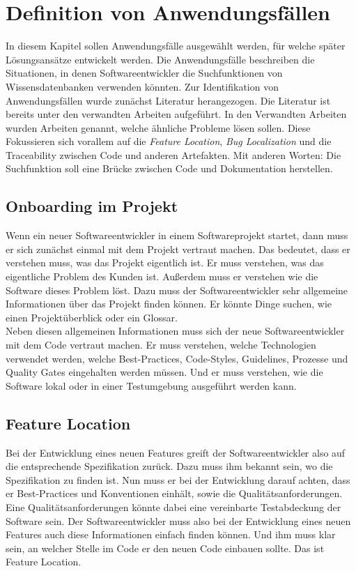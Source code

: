 \chapter{Definition von Anwendungsfällen}
In diesem Kapitel sollen Anwendungsfälle ausgewählt werden, für welche später Lösungsansätze entwickelt werden.
Die Anwendungsfälle beschreiben die Situationen, in denen Softwareentwickler die Suchfunktionen von Wissensdatenbanken verwenden könnten.
Zur Identifikation von Anwendungsfällen wurde zunächst Literatur herangezogen.
Die Literatur ist bereits unter den verwandten Arbeiten aufgeführt.
In den Verwandten Arbeiten wurden Arbeiten genannt, welche ähnliche Probleme lösen sollen.
Diese Fokussieren sich vorallem auf die \textit{Feature Location}, \textit{Bug Localization} und die Traceability zwischen Code und anderen Artefakten.
Mit anderen Worten: Die Suchfunktion soll eine Brücke zwischen Code und Dokumentation herstellen.\\

\section{Onboarding im Projekt}
Wenn ein neuer Softwareentwickler in einem Softwareprojekt startet, dann muss er sich zunächst einmal mit dem Projekt vertraut machen.
Das bedeutet, dass er verstehen muss, was das Projekt eigentlich ist.
Er muss verstehen, was das eigentliche Problem des Kunden ist.
Außerdem muss er verstehen wie die Software dieses Problem löst.
Dazu muss der Softwareentwickler sehr allgemeine Informationen über das Projekt finden können.
Er könnte Dinge suchen, wie einen Projektüberblick oder ein Glossar.\\

Neben diesen allgemeinen Informationen muss sich der neue Softwareentwickler mit dem Code vertraut machen.
Er muss verstehen, welche Technologien verwendet werden, welche Best-Practices, Code-Styles, Guidelines, Prozesse und Quality Gates eingehalten werden müssen.
Und er muss verstehen, wie die Software lokal oder in einer Testumgebung ausgeführt werden kann.\\

\section{Feature Location}
Bei der Entwicklung eines neuen Features greift der Softwareentwickler also auf die entsprechende Spezifikation zurück.
Dazu muss ihm bekannt sein, wo die Spezifikation zu finden ist.
Nun muss er bei der Entwicklung darauf achten, dass er Best-Practices und Konventionen einhält, sowie die Qualitätsanforderungen.
Eine Qualitätsanforderungen könnte dabei eine vereinbarte Testabdeckung der Software sein.
Der Softwareentwickler muss also bei der Entwicklung eines neuen Features auch diese Informationen einfach finden können.
Und ihm muss klar sein, an welcher Stelle im Code er den neuen Code einbauen sollte.
Das ist Feature Location.

